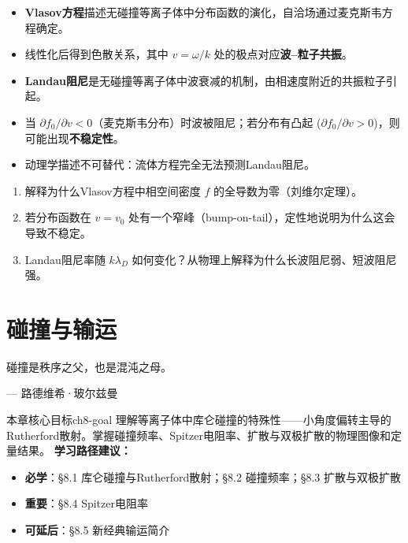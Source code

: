 \documentclass[12pt,a4paper,openany,oneside]{book}
\begin{document}
\begin{chapterreview}
\begin{itemize}
\item \textbf{Vlasov方程}描述无碰撞等离子体中分布函数的演化，自洽场通过麦克斯韦方程确定。
\item 线性化后得到色散关系，其中 $v = \omega/k$ 处的极点对应\textbf{波--粒子共振}。
\item \textbf{Landau阻尼}是无碰撞等离子体中波衰减的机制，由相速度附近的共振粒子引起。
\item 当 $\partial f_0/\partial v < 0$（麦克斯韦分布）时波被阻尼；若分布有凸起 ($\partial f_0/\partial v > 0$)，则可能出现\textbf{不稳定性}。
\item 动理学描述不可替代：流体方程完全无法预测Landau阻尼。
\end{itemize}
\end{chapterreview}

\begin{miniquiz}
\begin{enumerate}
\item 解释为什么Vlasov方程中相空间密度 $f$ 的全导数为零（刘维尔定理）。
\item 若分布函数在 $v=v_0$ 处有一个窄峰（bump-on-tail），定性地说明为什么这会导致不稳定。
\item Landau阻尼率随 $k\lambda_D$ 如何变化？从物理上解释为什么长波阻尼弱、短波阻尼强。
\end{enumerate}
\end{miniquiz}



\chapter{碰撞与输运}
\epigraph{碰撞是秩序之父，也是混沌之母。}{--- 路德维希·玻尔兹曼}

\begin{insight}{本章核心目标}{ch8-goal}
理解等离子体中库仑碰撞的特殊性——小角度偏转主导的Rutherford散射。掌握碰撞频率、Spitzer电阻率、扩散与双极扩散的物理图像和定量结果。
\tcblower
\textbf{学习路径建议：}

\begin{itemize}[leftmargin=*]
\item[\textcolor{red}{$\blacksquare$}] \textbf{必学}：\S8.1 库仑碰撞与Rutherford散射；\S8.2 碰撞频率；\S8.3 扩散与双极扩散
\item[\textcolor{orange}{$\blacksquare$}] \textbf{重要}：\S8.4 Spitzer电阻率
\item[\textcolor{green}{$\blacksquare$}] \textbf{可延后}：\S8.5 新经典输运简介
\end{itemize}
\end{insight}
\end{document}
